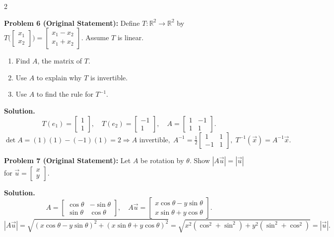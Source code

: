 \documentclass[8pt]{extarticle}
\begin{document}
\begin{multicols}{2}
\begin{tcolorbox}[title=]
\noindent
\textbf{Problem 6 (Original Statement):}
Define \(T:\mathbb{R}^{2}\to\mathbb{R}^{2}\) by
\(
T\big(\begin{bmatrix}x_{1}\\x_{2}\end{bmatrix}\big)
=\begin{bmatrix}x_{1}-x_{2}\\x_{1}+x_{2}\end{bmatrix}.
\)
Assume \(T\) is linear.
\begin{enumerate}
\item[(a)] Find \(A\), the matrix of \(T\).
\item[(b)] Use \(A\) to explain why \(T\) is invertible.
\item[(c)] Use \(A\) to find the rule for \(T^{-1}\).
\end{enumerate}

\textbf{Solution.}
\[
T(e_{1})=\begin{bmatrix}1\\1\end{bmatrix},\quad
T(e_{2})=\begin{bmatrix}-1\\1\end{bmatrix},\quad
A=\begin{bmatrix}1&-1\\1&1\end{bmatrix}.
\]
\[
\det A=(1)(1)-(-1)(1)=2\Rightarrow A\text{ invertible},\;
A^{-1}=\tfrac12\begin{bmatrix}1&1\\-1&1\end{bmatrix},\;
T^{-1}(\vec x)=A^{-1}\vec x.
\]
\end{tcolorbox}

\begin{tcolorbox}[title=]
\noindent
\textbf{Problem 7 (Original Statement):}  
Let \(A\) be rotation by \(\theta\). Show \(|A\vec u|=|\vec u|\) for \(\vec u=\begin{bmatrix}x\\y\end{bmatrix}\).

\textbf{Solution.}
\[
A=\begin{bmatrix}\cos\theta&-\sin\theta\\ \sin\theta&\cos\theta\end{bmatrix},\quad
A\vec u=\begin{bmatrix}x\cos\theta-y\sin\theta\\ x\sin\theta+y\cos\theta\end{bmatrix}.
\]
\[
|A\vec u|
=\sqrt{(x\cos\theta-y\sin\theta)^2+(x\sin\theta+y\cos\theta)^2}
=\sqrt{x^2(\cos^2+\sin^2)+y^2(\sin^2+\cos^2)}
=|\vec u|.
\]
\end{tcolorbox}


\end{multicols}
\end{document}

